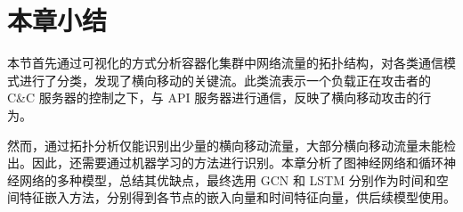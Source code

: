 {\section{本章小结}

本节首先通过可视化的方式分析容器化集群中网络流量的拓扑结构，对各类通信模式进行了分类，发现了横向移动的关键流。此类流表示一个负载正在攻击者的 C\&C 服务器的控制之下，与 API 服务器进行通信，反映了横向移动攻击的行为。

然而，通过拓扑分析仅能识别出少量的横向移动流量，大部分横向移动流量未能检出。因此，还需要通过机器学习的方法进行识别。本章分析了图神经网络和循环神经网络的多种模型，总结其优缺点，最终选用 GCN 和 LSTM 分别作为时间和空间特征嵌入方法，分别得到各节点的嵌入向量和时间特征向量，供后续模型使用。

}